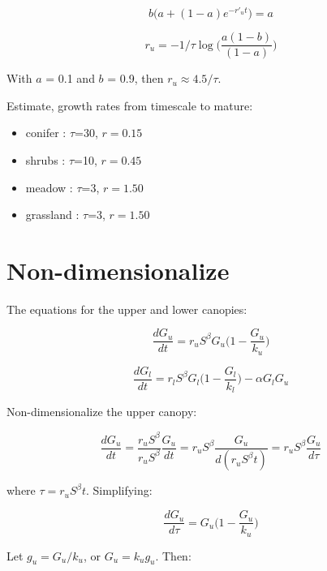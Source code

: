 \documentclass{article}
\begin{document}
\begin{equation}
    b ({ a  +(1- a ) e^{-r'_u t}) ={ a  }}
\end{equation}

\begin{equation}
r_u =   - 1/ \tau \log \big(\frac{a (1-b) }{(1- a )}\big)
\end{equation}


With $a$ = 0.1 and $b$ = 0.9, then $r_u \approx 4.5/ \tau$.

Estimate, growth rates from timescale to mature:

\begin{itemize}
\item conifer : $\tau$=30, $r=0.15$
\item shrubs : $\tau$=10, $r=0.45$
\item meadow : $\tau$=3, $r=1.50$
\item grassland : $\tau$=3, $r=1.50$
\end{itemize}


\section{Non-dimensionalize}

The equations for the upper and lower canopies:

\begin{equation*}
	 \frac{d G_u}{dt} =
	 r_u S^\beta G_u \bigg(1-\frac{G_u}{k_u}\bigg)
\end{equation*}


\begin{equation*}
	 \frac{d G_l}{dt} = r_l S^\beta G_l \bigg(1-\frac{G_l}{k_l}\bigg) - \alpha G_l G_u
\end{equation*}

Non-dimensionalize the upper canopy:

\begin{equation*}
    \frac{d G_u}{dt} =
     \frac{r_u S^\beta}{r_u S^\beta} \frac{G_u}{dt} =
  	{r_u S^\beta} \frac{G_u}{d(r_u S^\beta t)} =
	r_u S^\beta \frac{G_u}{d \tau}
\end{equation*}

where $\tau = r_u S^\beta t$.  Simplifying:

\begin{equation*}
    \frac{d G_u}{d\tau} =
    G_u \bigg(1-\frac{G_u}{k_u}\bigg)
\end{equation*}


Let  $g_u = G_u/k_u$, or   $G_u =   k_u g_u$.  Then:
\end{document}
